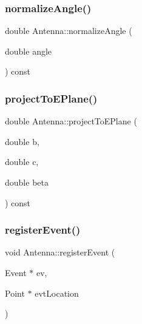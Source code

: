 \mbox{\label{class_antenna_a353ae3aafbc75033c30fb96004c2b73f}} 
\subsubsection{\texorpdfstring{normalize\+Angle()}{normalizeAngle()}}
{\footnotesize\ttfamily double Antenna\+::normalize\+Angle (\begin{DoxyParamCaption}\item[{double}]{angle }\end{DoxyParamCaption}) const\hspace{0.3cm}{\ttfamily [private]}}

\mbox{\label{class_antenna_a298c80a54828c8f13d584e8e382145a5}} 
\subsubsection{\texorpdfstring{project\+To\+E\+Plane()}{projectToEPlane()}}
{\footnotesize\ttfamily double Antenna\+::project\+To\+E\+Plane (\begin{DoxyParamCaption}\item[{double}]{b,  }\item[{double}]{c,  }\item[{double}]{beta }\end{DoxyParamCaption}) const\hspace{0.3cm}{\ttfamily [private]}}

\mbox{\label{class_antenna_aa931ec91c960c6d5704d4e25cf17229f}} 
\subsubsection{\texorpdfstring{register\+Event()}{registerEvent()}}
{\footnotesize\ttfamily void Antenna\+::register\+Event (\begin{DoxyParamCaption}\item[{Event $\ast$}]{ev,  }\item[{Point $\ast$}]{evt\+Location }\end{DoxyParamCaption})\hspace{0.3cm}{\ttfamily [private]}}

